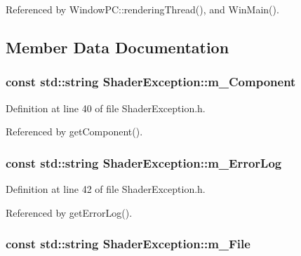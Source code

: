 Referenced by Window\+P\+C\+::rendering\+Thread(), and Win\+Main().



\subsection{Member Data Documentation}
\subsubsection[{\texorpdfstring{m\+\_\+\+Component}{m_Component}}]{\setlength{\rightskip}{0pt plus 5cm}const std\+::string Shader\+Exception\+::m\+\_\+\+Component\hspace{0.3cm}{\ttfamily [private]}}\hypertarget{class_shader_exception_aa87a250d03b97c4080d3e287fbda9dd1}{}\label{class_shader_exception_aa87a250d03b97c4080d3e287fbda9dd1}


Definition at line 40 of file Shader\+Exception.\+h.



Referenced by get\+Component().

\subsubsection[{\texorpdfstring{m\+\_\+\+Error\+Log}{m_ErrorLog}}]{\setlength{\rightskip}{0pt plus 5cm}const std\+::string Shader\+Exception\+::m\+\_\+\+Error\+Log\hspace{0.3cm}{\ttfamily [private]}}\hypertarget{class_shader_exception_ad8b59e0d8c6bda3add539cb0386579d2}{}\label{class_shader_exception_ad8b59e0d8c6bda3add539cb0386579d2}


Definition at line 42 of file Shader\+Exception.\+h.



Referenced by get\+Error\+Log().

\subsubsection[{\texorpdfstring{m\+\_\+\+File}{m_File}}]{\setlength{\rightskip}{0pt plus 5cm}const std\+::string Shader\+Exception\+::m\+\_\+\+File\hspace{0.3cm}{\ttfamily [private]}}\hypertarget{class_shader_exception_a0f130003946a31fb9f79258f5b2978c6}{}\label{class_shader_exception_a0f130003946a31fb9f79258f5b2978c6}


